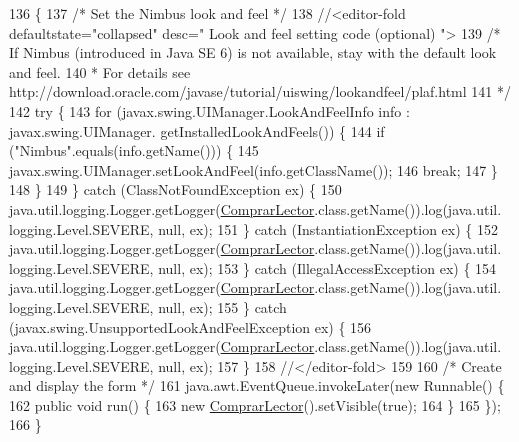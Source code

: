 \begin{DoxyCode}
136                                            \{
137         \textcolor{comment}{/* Set the Nimbus look and feel */}
138         \textcolor{comment}{//<editor-fold defaultstate="collapsed" desc=" Look and feel setting code (optional) ">}
139         \textcolor{comment}{/* If Nimbus (introduced in Java SE 6) is not available, stay with the default look and feel.}
140 \textcolor{comment}{         * For details see http://download.oracle.com/javase/tutorial/uiswing/lookandfeel/plaf.html }
141 \textcolor{comment}{         */}
142         \textcolor{keywordflow}{try} \{
143             \textcolor{keywordflow}{for} (javax.swing.UIManager.LookAndFeelInfo info : javax.swing.UIManager.
      getInstalledLookAndFeels()) \{
144                 \textcolor{keywordflow}{if} (\textcolor{stringliteral}{"Nimbus"}.equals(info.getName())) \{
145                     javax.swing.UIManager.setLookAndFeel(info.getClassName());
146                     \textcolor{keywordflow}{break};
147                 \}
148             \}
149         \} \textcolor{keywordflow}{catch} (ClassNotFoundException ex) \{
150             java.util.logging.Logger.getLogger(\mbox{\hyperlink{class_interfaz_package_1_1_comprar_lector_a8df28b89646bb4ca519fe3af6ca554c9}{ComprarLector}}.class.getName()).log(java.util.
      logging.Level.SEVERE, null, ex);
151         \} \textcolor{keywordflow}{catch} (InstantiationException ex) \{
152             java.util.logging.Logger.getLogger(\mbox{\hyperlink{class_interfaz_package_1_1_comprar_lector_a8df28b89646bb4ca519fe3af6ca554c9}{ComprarLector}}.class.getName()).log(java.util.
      logging.Level.SEVERE, null, ex);
153         \} \textcolor{keywordflow}{catch} (IllegalAccessException ex) \{
154             java.util.logging.Logger.getLogger(\mbox{\hyperlink{class_interfaz_package_1_1_comprar_lector_a8df28b89646bb4ca519fe3af6ca554c9}{ComprarLector}}.class.getName()).log(java.util.
      logging.Level.SEVERE, null, ex);
155         \} \textcolor{keywordflow}{catch} (javax.swing.UnsupportedLookAndFeelException ex) \{
156             java.util.logging.Logger.getLogger(\mbox{\hyperlink{class_interfaz_package_1_1_comprar_lector_a8df28b89646bb4ca519fe3af6ca554c9}{ComprarLector}}.class.getName()).log(java.util.
      logging.Level.SEVERE, null, ex);
157         \}
158         \textcolor{comment}{//</editor-fold>}
159 
160         \textcolor{comment}{/* Create and display the form */}
161         java.awt.EventQueue.invokeLater(\textcolor{keyword}{new} Runnable() \{
162             \textcolor{keyword}{public} \textcolor{keywordtype}{void} run() \{
163                 \textcolor{keyword}{new} \mbox{\hyperlink{class_interfaz_package_1_1_comprar_lector_a8df28b89646bb4ca519fe3af6ca554c9}{ComprarLector}}().setVisible(\textcolor{keyword}{true});
164             \}
165         \});
166     \}
\end{DoxyCode}


